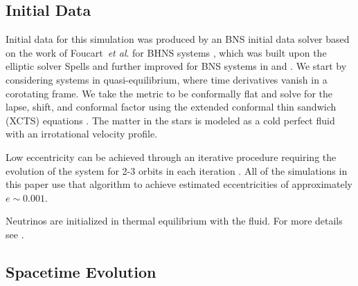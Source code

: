\subsection{Initial Data}

Initial data for this simulation was produced by an BNS initial data solver based on the work of Foucart~{\it et
al}. for BHNS systems \cite{foucart2008initial}, which was built upon the elliptic solver Spells \cite{pfeiffer2003} and further improved for BNS systems in \cite{tacik2015binary} and \cite{haas:2016}. We start by considering systems in quasi-equilibrium, where time
derivatives vanish in a corotating frame. We take the metric to be conformally flat and solve for the lapse,
shift, and conformal factor using the extended conformal thin sandwich (XCTS) equations \cite{pfeiffer2003b}. The matter in the stars is modeled as a cold perfect fluid with an irrotational velocity profile.

Low eccentricity can be achieved through an iterative procedure requiring the evolution of the system for 2-3 orbits in each iteration \cite{pfeiffer2007reducing}. All of the simulations in this paper use that algorithm to achieve estimated eccentricities of approximately $e\sim 0.001$.

Neutrinos are initialized in thermal equilibrium with the fluid. For more details see \cite{foucart2016impact}.


\subsection{Spacetime Evolution}


